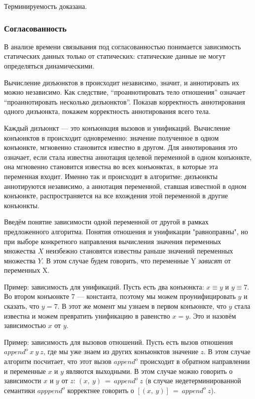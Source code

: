 Терминируемость доказана.


\subsubsection{Согласованность}

В анализе времени связывания под согласованностью понимается зависимость статических данных только от статических: статические данные не могут определяться динамическими.

Вычисление дизъюнктов в \miniKanren{} происходит независимо, значит, и аннотировать их можно независимо.
Как следствие, ``проаннотировать тело отношения'' означает ``проаннотировать несколько дизъюнктов''.
Показав корректность аннотирования одного дизъюнкта, покажем корректность аннотирования всего тела.

Каждый дизъюнкт --- это конъюнкция вызовов и унификаций.
Вычисление конъюнктов в \miniKanren{} происходит одновременно: значение полученное в одном конъюнкте, мгновенно становится известно в другом.
Для аннотирования это означает, если стала известна аннотация целевой переменной в одном конъюнкте, она мгновенно становится известна во всех конъюнктах, в которые эта переменная входит.
Именно так и происходит в алгоритме: дизъюнкты аннотируются независимо, а аннотация переменной, ставшая известной в одном конъюнкте, распространяется на все вхождения этой переменной в другие конъюнкты.

Введём понятие зависимости одной переменной от другой в рамках предложенного алгоритма.
Понятия отношения и унификации "равноправны", но при выборе конкретного направления вычисления значения переменных множества $X$ неизбежно становятся известны раньше значений переменных множества $Y$.
В этом случае будем говорить, что переменные Y \emph{зависят} от переменных X.

Пример: зависимость для унификаций.
Пусть есть два конъюнкта: $x \equiv y$ и $y \equiv 7$.
Во втором конъюнкте $7$ --- константа, поэтому мы можем проунифицировать $y$ и сказать, что $y = 7$.
В этот же момент мы узнаем в первом конъюнкте, что $y$ стала известна и можем превратить унификацию в равенство $x = y$. Это и назовём зависимостью $x$ от $y$.

Пример: зависимость для вызовов отношений.
Пусть есть вызов отношения $append^o~x~y~z$, где мы уже знаем из других конъюнктов значение $z$.
В этом случае алгоритм посчитает, что этот вызов $append^o$ происходит в обратном направлении и переменные $x$ и $y$ являются выходными.
В этом случае можно говорить о зависимости $x$ и $y$ от $z$: $(x,~y)~=~append^o~z$ (в случае недетерминированной семантики $apppend^o$ корректнее говорить о $[(x,~y)]~=~append^o~z$).

